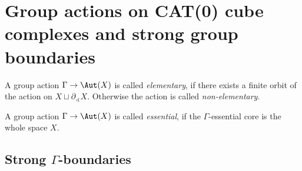 \section{Group actions on CAT(0) cube complexes and strong group boundaries}
\label{sec:group}

\begin{defin}
  A group action \(\Gamma \to \Aut(X)\) is called \emph{elementary}, if there exists a finite orbit of the action on \(X \sqcup \partial_{\sphericalangle}X\). Otherwise the action is called \emph{non-elementary}.
\end{defin}

\begin{defin}
  A group action \(\Gamma \to \Aut(X)\) is called \emph{essential}, if the \(\Gamma\)-essential core is the whole space \(X\).
\end{defin}


\begin{defin}
\end{defin}


\subsection{Strong \(\Gamma\)-boundaries}
\label{sec:grp-boundary}

